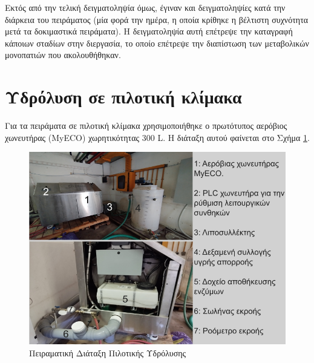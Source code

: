 \documentclass[11pt]{report}
\begin{document}
Εκτός από την τελική δειγματοληψία όμως, έγιναν και δειγματοληψίες κατά την διάρκεια του πειράματος (μία φορά την ημέρα, η οποία κρίθηκε η βέλτιστη συχνότητα μετά τα δοκιμαστικά πειράματα). Η δειγματοληψία αυτή επέτρεψε την καταγραφή κάποιων σταδίων στην διεργασία, το οποίο επέτρεψε την διαπίστωση των μεταβολικών μονοπατιών που ακολουθήθηκαν.

\section{Υδρόλυση σε πιλοτική κλίμακα}
\label{sec:org3288570}
\label{sec:pilot-exp}

Για τα πειράματα σε πιλοτική κλίμακα χρησιμοποιήθηκε ο πρωτότυπος αερόβιος χωνευτήρας (MyECO) χωρητικότητας 300 L. Η διάταξη αυτού φαίνεται στο Σχήμα \ref{fig:org4b33ff5}.

\begin{figure}[htbp]
\centering
\includegraphics[width=.9\linewidth]{./pilot_hydrolysis_captioned.png}
\caption{\label{fig:org4b33ff5}Πειραματική Διάταξη Πιλοτικής Υδρόλυσης}
\end{figure}
\end{document}
